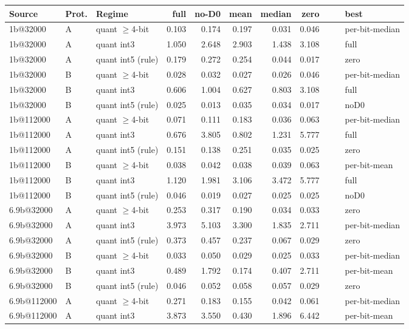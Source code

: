 \begin{table}[t]
\begin{tabular}{@{}lllrrrrrrrl@{}}
\midrule
Source & Prot. & Regime & full & no-D0 & mean & median & zero & & & best \\
\midrule
1b@32000 & A & quant $\ge$4-bit & 0.103 & 0.174 & 0.197 & 0.031 & 0.046 & & & per-bit-median \\
1b@32000 & A & quant int3 & 1.050 & 2.648 & 2.903 & 1.438 & 3.108 & & & full \\
1b@32000 & A & quant int5 (rule) & 0.179 & 0.272 & 0.254 & 0.044 & 0.017 & & & zero \\
1b@32000 & B & quant $\ge$4-bit & 0.028 & 0.032 & 0.027 & 0.026 & 0.046 & & & per-bit-median \\
1b@32000 & B & quant int3 & 0.606 & 1.004 & 0.627 & 0.803 & 3.108 & & & full \\
1b@32000 & B & quant int5 (rule) & 0.025 & 0.013 & 0.035 & 0.034 & 0.017 & & & noD0 \\
1b@112000 & A & quant $\ge$4-bit & 0.071 & 0.111 & 0.183 & 0.036 & 0.063 & & & per-bit-median \\
1b@112000 & A & quant int3 & 0.676 & 3.805 & 0.802 & 1.231 & 5.777 & & & full \\
1b@112000 & A & quant int5 (rule) & 0.151 & 0.138 & 0.251 & 0.035 & 0.025 & & & zero \\
1b@112000 & B & quant $\ge$4-bit & 0.038 & 0.042 & 0.038 & 0.039 & 0.063 & & & per-bit-mean \\
1b@112000 & B & quant int3 & 1.120 & 1.981 & 3.106 & 3.472 & 5.777 & & & full \\
1b@112000 & B & quant int5 (rule) & 0.046 & 0.019 & 0.027 & 0.025 & 0.025 & & & noD0 \\
6.9b@32000 & A & quant $\ge$4-bit & 0.253 & 0.317 & 0.190 & 0.034 & 0.033 & & & zero \\
6.9b@32000 & A & quant int3 & 3.973 & 5.103 & 3.300 & 1.835 & 2.711 & & & per-bit-median \\
6.9b@32000 & A & quant int5 (rule) & 0.373 & 0.457 & 0.237 & 0.067 & 0.029 & & & zero \\
6.9b@32000 & B & quant $\ge$4-bit & 0.033 & 0.050 & 0.029 & 0.025 & 0.033 & & & per-bit-median \\
6.9b@32000 & B & quant int3 & 0.489 & 1.792 & 0.174 & 0.407 & 2.711 & & & per-bit-mean \\
6.9b@32000 & B & quant int5 (rule) & 0.046 & 0.052 & 0.058 & 0.057 & 0.029 & & & zero \\
6.9b@112000 & A & quant $\ge$4-bit & 0.271 & 0.183 & 0.155 & 0.042 & 0.061 & & & per-bit-median \\
6.9b@112000 & A & quant int3 & 3.873 & 3.550 & 0.430 & 1.896 & 6.442 & & & per-bit-mean \\

\end{tabular}
\end{table}
